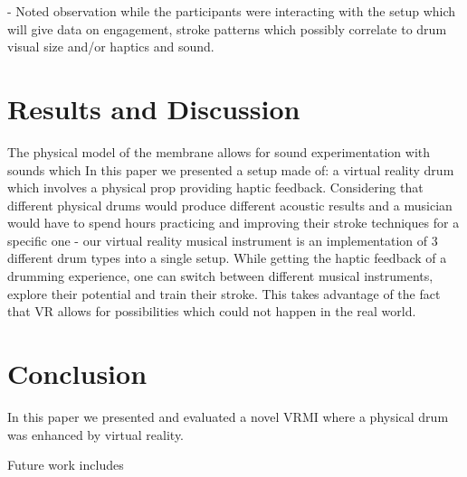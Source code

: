 \documentclass{vgtc}
\begin{document}
- Noted observation while the participants were interacting with the setup which will give data on engagement, stroke patterns which possibly correlate to drum visual size and/or haptics and sound.

\section{Results and Discussion}\label{sec:resDisc}
The physical model of the membrane allows for sound experimentation with sounds which 
In this paper we presented a setup made of: a virtual reality drum which involves a physical prop providing haptic feedback. Considering that different physical drums would produce different acoustic results and a musician would have to spend hours practicing and improving their stroke techniques for a specific one - our virtual reality musical instrument is an implementation of 3 different drum types into a single setup. While getting the haptic feedback of a drumming experience, one can switch between different musical instruments, explore their potential and train their stroke. This takes advantage of the fact that VR allows for possibilities which could not happen in the real world.

\section{Conclusion}\label{sec:conc}

In this paper we presented and evaluated a novel VRMI where a physical drum was enhanced by virtual reality. 

Future work includes 


%

%
%
%


\end{document}
